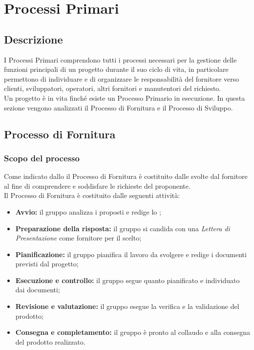 \section{Processi Primari}
\label{PP}
\subsection{Descrizione}\label{PP_Descrizione}
I Processi Primari comprendono tutti i processi necessari per la gestione delle funzioni principali di un progetto durante il suo ciclo di vita, in particolare permettono di individuare e di organizzare le responsabilità del fornitore verso clienti, sviluppatori, operatori, altri fornitori e manutentori del  richiesto.\\
Un progetto è in vita finché esiste un Processo Primario in esecuzione.
In questa sezione vengono analizzati il Processo di Fornitura e il Processo di Sviluppo.

\subsection{Processo di Fornitura}
\subsubsection{Scopo del processo}\label{PF_Scopo}
Come indicato dallo   il Processo di Fornitura è costituito dalle   svolte dal fornitore al fine di comprendere e soddisfare le richieste del proponente.\\
Il Processo di Fornitura è costituito dalle seguenti attività:
\begin{itemize}
	\item \textbf{Avvio:} il gruppo analizza i  proposti e redige lo ;
	\item \textbf{Preparazione della risposta:} il gruppo si candida con una \textit{Lettera di Presentazione} come fornitore per il  scelto;
	\item \textbf{Pianificazione:} il gruppo pianifica il lavoro da svolgere e redige i documenti previsti dal progetto;
	\item \textbf{Esecuzione e controllo:} il gruppo segue quanto pianificato e individuato dai documenti;
	\item \textbf{Revisione e valutazione:} il gruppo esegue la verifica e la validazione del prodotto;
	\item \textbf{Consegna e completamento:} il gruppo è pronto al collaudo e alla consegna del prodotto realizzato.
\end{itemize}


